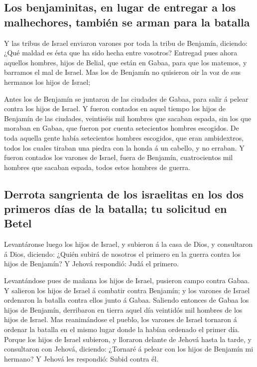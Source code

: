 \hypertarget{los-benjaminitas-en-lugar-de-entregar-a-los-malhechores-tambiuxe9n-se-arman-para-la-batalla}{%
\subsection{Los benjaminitas, en lugar de entregar a los malhechores,
también se arman para la
batalla}\label{los-benjaminitas-en-lugar-de-entregar-a-los-malhechores-tambiuxe9n-se-arman-para-la-batalla}}

 Y las tribus de Israel enviaron varones por toda la tribu
de Benjamín, diciendo: ¿Qué maldad es ésta que ha sido hecha entre
vosotros?  Entregad pues ahora aquellos hombres, hijos de
Belial, que están en Gabaa, para que los matemos, y barramos el mal de
Israel. Mas los de Benjamín no quisieron oir la voz de sus hermanos los
hijos de Israel;

 Antes los de Benjamín se juntaron de las ciudades de
Gabaa, para salir á pelear contra los hijos de Israel.  Y
fueron contados en aquel tiempo los hijos de Benjamín de las ciudades,
veintiséis mil hombres que sacaban espada, sin los que moraban en Gabaa,
que fueron por cuenta setecientos hombres escogidos.  De
toda aquella gente había setecientos hombres escogidos, que eran
ambidextros, todos los cuales tiraban una piedra con la honda á un
cabello, y no erraban.  Y fueron contados los varones de
Israel, fuera de Benjamín, cuatrocientos mil hombres que sacaban espada,
todos estos hombres de guerra.

\hypertarget{derrota-sangrienta-de-los-israelitas-en-los-dos-primeros-duxedas-de-la-batalla-tu-solicitud-en-betel}{%
\subsection{Derrota sangrienta de los israelitas en los dos primeros
días de la batalla; tu solicitud en
Betel}\label{derrota-sangrienta-de-los-israelitas-en-los-dos-primeros-duxedas-de-la-batalla-tu-solicitud-en-betel}}

 Levantáronse luego los hijos de Israel, y subieron á la
casa de Dios, y consultaron á Dios, diciendo: ¿Quién subirá de nosotros
el primero en la guerra contra los hijos de Benjamín? Y Jehová
respondió: Judá el primero.

 Levantándose pues de mañana los hijos de Israel, pusieron
campo contra Gabaa.  Y salieron los hijos de Israel á
combatir contra Benjamín; y los varones de Israel ordenaron la batalla
contra ellos junto á Gabaa.  Saliendo entonces de Gabaa los
hijos de Benjamín, derribaron en tierra aquel día veintidós mil hombres
de los hijos de Israel.  Mas reanimándose el pueblo, los
varones de Israel tornaron á ordenar la batalla en el mismo lugar donde
la habían ordenado el primer día.  Porque los hijos de
Israel subieron, y lloraron delante de Jehová hasta la tarde, y
consultaron con Jehová, diciendo: ¿Tornaré á pelear con los hijos de
Benjamín mi hermano? Y Jehová les respondió: Subid contra él.

